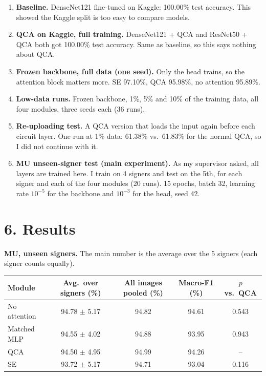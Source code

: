 \documentclass[11pt,a4paper]{article}
\begin{document}
\begin{enumerate}
  \item \textbf{Baseline.} DenseNet121 fine-tuned on Kaggle: 100.00\% test
        accuracy. This showed the Kaggle split is too easy to compare models.
  \item \textbf{QCA on Kaggle, full training.} DenseNet121 + QCA and
        ResNet50 + QCA both got 100.00\% test accuracy. Same as baseline, so
        this says nothing about QCA.
  \item \textbf{Frozen backbone, full data (one seed).} Only the head trains,
        so the attention block matters more. SE 97.10\%, QCA 95.98\%, no
        attention 95.89\%.
  \item \textbf{Low-data runs.} Frozen backbone, 1\%, 5\% and 10\% of the
        training data, all four modules, three seeds each (36 runs).
  \item \textbf{Re-uploading test.} A QCA version that loads the input again
        before each circuit layer. One run at 1\% data: 61.38\% vs.\ 61.83\%
        for the normal QCA, so I did not continue with it.
  \item \textbf{MU unseen-signer test (main experiment).} As my supervisor
        asked, all layers are trained here. I train on 4 signers and test on
        the 5th, for each signer and each of the four modules (20 runs).
        15 epochs, batch 32, learning rate $10^{-5}$ for the backbone and
        $10^{-3}$ for the head, seed 42.
\end{enumerate}

\section*{6. Results}

\textbf{MU, unseen signers.} The main number is the average over the 5
signers (each signer counts equally).

\begin{table}[H]
\centering
\begin{tabular}{lcccc}
\toprule
Module & Avg.\ over signers (\%) & All images pooled (\%) & Macro-F1 (\%) & $p$ vs.\ QCA \\
\midrule
No attention & 94.78 $\pm$ 5.17 & 94.82 & 94.61 & 0.543 \\
Matched MLP & 94.55 $\pm$ 4.02 & 94.88 & 93.95 & 0.943 \\
QCA & 94.50 $\pm$ 4.95 & 94.99 & 94.26 & -- \\
SE & 93.72 $\pm$ 5.17 & 94.71 & 93.04 & 0.116 \\
\bottomrule
\end{tabular}
\end{table}
\end{document}

